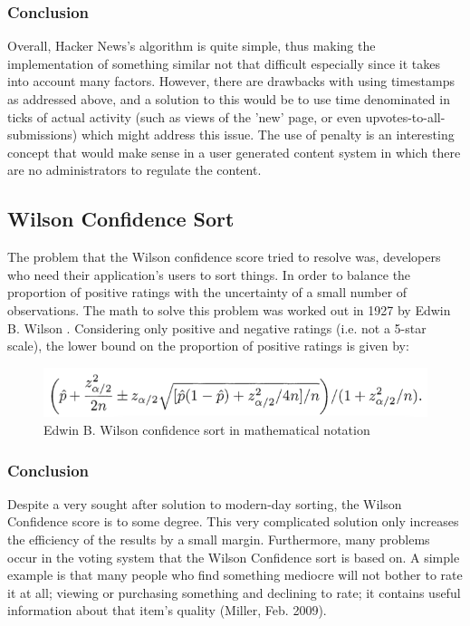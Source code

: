 \subsubsection {Conclusion}
Overall, Hacker News's algorithm is quite simple, thus making the implementation of something similar not that difficult especially since it takes into account many factors. However, there are drawbacks with using timestamps as addressed above, and a solution to this would be to use time denominated in ticks of actual activity (such as views of the 'new' page, or even upvotes-to-all-submissions) which might address this issue.
The use of penalty is an interesting concept that would make sense in a user generated content system in which there are no administrators to regulate the content.

\subsection {Wilson Confidence Sort}
The problem that the Wilson confidence score tried to resolve was, developers who need their application's users to sort things. In order to balance the proportion of positive ratings with the uncertainty of a small number of observations. The math to solve this problem was worked out in 1927 by Edwin B. Wilson \cite{miller_2009_how}. Considering only positive and negative ratings (i.e. not a 5-star scale), the lower bound on the proportion of positive ratings is given by:

\begin{figure} [!htb]
  \centering
	\includegraphics[scale=0.5]{Figures/wilson_confidence}
\caption{Edwin B. Wilson confidence sort in mathematical notation}
\end{figure}

\subsubsection{Conclusion}
Despite a very sought after solution to modern-day sorting, the Wilson Confidence score is to some degree. This very complicated solution only increases the efficiency of the results by a small margin. Furthermore, many problems occur in the voting system that the Wilson Confidence sort is based on. A simple example is that many people who find something mediocre will not bother to rate it at all; viewing or purchasing something and declining to rate; it contains useful information about that item's quality (Miller, Feb. 2009).


